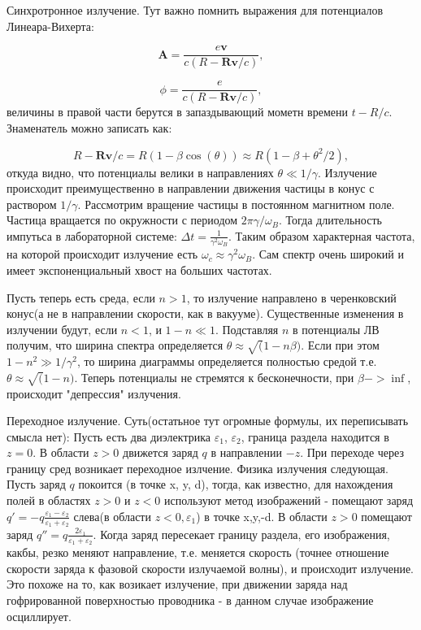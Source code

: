 \documentclass[10pt, a4paper]{article}
\begin{document}
Синхротронное излучение.
Тут важно помнить выражения для потенциалов Линеара-Вихерта:

\begin{equation}
    \mathbf{A}=\frac{e\mathbf{v}}{c(R-\mathbf{R}\mathbf{v}/c)},
\end{equation}

\begin{equation}
    \phi=\frac{e}{c(R-\mathbf{R}\mathbf{v}/c)},
\end{equation}
величины в правой части берутся в запаздывающий мометн времени $t-R/c$. Знаменатель можно записать как:

\begin{equation}
    R - \mathbf{R}\mathbf{v}/c=R(1-\beta\cos(\theta))\approx R(1-\beta+\theta^2/2),
\end{equation}
откуда видно, что потенциалы велики в направлениях $\theta \ll 1/\gamma$. Излучение происходит преимущественно в
направлении движения частицы в конус с раствором $1/\gamma$. Рассмотрим вращение частицы в постоянном магнитном поле. 
Частица вращается по окружности с периодом $2\pi\gamma/\omega_B$. Тогда длительность импутьса в лабораторной системе:
$\Delta t = \frac{1}{\gamma^2\omega_B}$. Таким образом характерная частота, на которой происходит излучение есть 
$\omega_c \approx \gamma^2\omega_B$. Сам спектр очень широкий и имеет экспоненциальный хвост на больших частотах.

Пусть теперь есть среда, если $n>1$, то излучение направлено в черенковский конус(а не в направлении скорости, как в 
вакууме).
Существенные изменения в излучении будут, если $n<1$, и $1-n\ll1$. Подставляя $n$ в потенциалы ЛВ получим, что
ширина спектра определяется $\theta \approx \sqrt(1-n\beta)$. Если при этом $1-n^2\gg1/\gamma^2$, то ширина диаграммы
определяется полностью средой т.е. $\theta\approx\sqrt(1-n)$. Теперь потенциалы не стремятся к бесконечности, при
$\beta ->\inf$, происходит "депрессия" излучения.

Переходное излучение.
Суть(остатьное тут огромные формулы, их переписывать смысла нет): Пусть есть два диэлектрика $\varepsilon_1$,
$\varepsilon_2$, граница раздела находится в $z=0$. В области $z>0$ движется заряд $q$ в направлении $-z$. При переходе
через границу сред возникает переходное излчение.
Физика излучения следующая. Пусть заряд $q$ покоится (в точке x, y, d), тогда, как известно, для нахождения
полей в областях $z>0$ и $z<0$ используют метод изображений - помещают заряд
$q'=-q\frac{\varepsilon_1-\varepsilon_2}{\varepsilon_1+\varepsilon_2}$ 
слева(в области $z<0, \varepsilon_1$) в точке x,y,-d. В области $z>0$ помещают 
заряд $q''=q\frac{2\varepsilon_1}{\varepsilon_1+\varepsilon_2}$.
Когда заряд пересекает границу раздела, его изображения, какбы, резко меняют направление, т.е. меняется скорость
(точнее отношение скорости заряда к фазовой скорости излучаемой волны), и происходит излучение. Это похоже на то,
как возикает излучение, при движении заряда над гофрированной поверхностью проводника - в данном случае изображение 
осциллирует.
\end{document}
